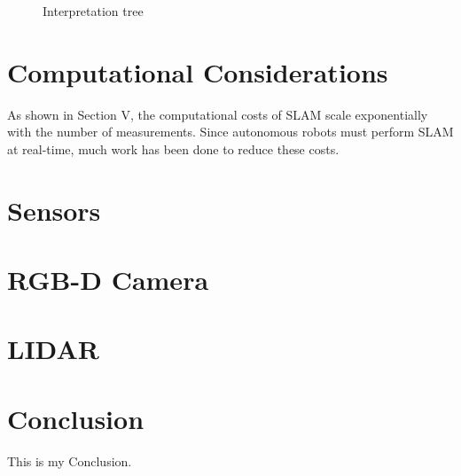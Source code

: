 \documentclass[10pt,conference]{ieeeconf}
\begin{document}
	\begin{figure}
	\caption{Interpretation tree}
	\label{tree}
	\end{figure}

\section {Computational Considerations}

	As shown in Section V, the computational costs of SLAM scale exponentially with the number of measurements. Since autonomous robots must perform SLAM at real-time, much work has been done to reduce these costs.
	
	
	
	
	
	
	
\section {Sensors}

	\section {RGB-D Camera}
	
	\section {LIDAR}


\section {Conclusion}
    This is my Conclusion.




\end{document}
